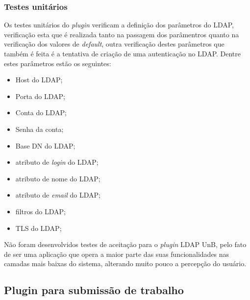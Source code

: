 
\subsubsection{Testes unitários}
%
Os testes unitários do \textit{plugin} verificam a definição dos parâmetros do LDAP, verificação esta que é realizada tanto na passagem dos parâmentros quanto na verificação dos valores de \textit{default}, outra verificação destes parâmetros que também é feita é a tentativa de criação de uma autenticação no LDAP. Dentre estes parâmetros estão os seguintes:

\begin{itemize}
\item Host do LDAP;
\item Porta do LDAP;
\item Conta do LDAP;
\item Senha da conta;
\item Base DN do LDAP;
\item atributo de \textit{login} do LDAP;
\item atributo de nome do LDAP;
\item atributo de \textit{email} do LDAP;
\item filtros do LDAP;
\item TLS do LDAP;
\end{itemize}

Não foram desenvolvidos testes de aceitação para o \textit{plugin} LDAP UnB, pelo fato de ser uma aplicação que opera a maior parte das suas funcionalidades nas camadas mais baixas do sistema, alterando muito pouco a percepção do usuário.

\subsection{Plugin para submissão de trabalho}

